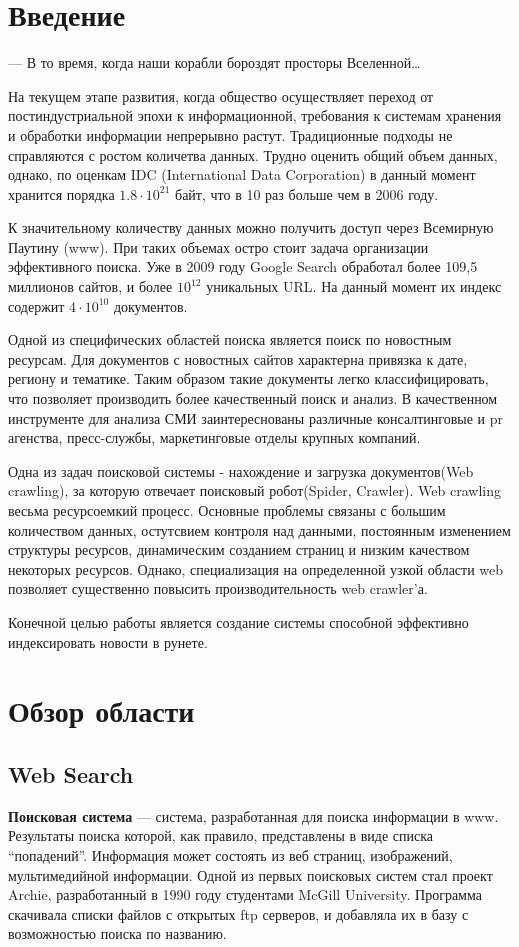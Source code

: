 \chapter{Введение} 
\epigraph{— В то время, когда наши корабли бороздят просторы
Вселенной…}{} На текущем этапе развития, когда общество осуществляет переход от
постиндустриальной эпохи к информационной, требования к системам хранения и
обработки информации непрерывно растут. Традиционные подходы не справляются с
ростом количетва данных. Трудно оценить общий объем данных, однако, по оценкам
IDC (International Data Corporation) в данный момент хранится порядка
$1.8\cdot10^{21}$ байт, что в 10 раз больше чем в 2006 году.

К значительному количеству данных можно получить доступ через Всемирную Паутину
(www). При таких объемах остро стоит задача организации эффективного поиска. Уже
в 2009 году Google Search обработал более 109,5 миллионов сайтов, и более
$10^{12}$ уникальных URL. На данный момент их индекс содержит $4\cdot10^{10}$ документов.

Одной из специфических областей поиска является поиск по новостным ресурсам.
 Для документов с новостных сайтов характерна привязка к дате, региону и тематике.
 Таким образом такие документы легко классифицировать, что позволяет производить более качественный поиск и анализ.
 В качественном инструменте для анализа СМИ заинтереснованы различные консалтинговые и pr агенства, пресс-службы, маркетинговые отделы крупных компаний.

Одна из задач поисковой системы - нахождение и загрузка документов(Web crawling), за которую отвечает поисковый робот(Spider, Crawler).
 Web crawling весьма ресурсоемкий процесс. Основные проблемы связаны с большим количеством данных,
 остутсвием  контроля над данными, постоянным изменением структуры ресурсов, динамическим созданием страниц и низким качеством некоторых ресурсов.
 Однако, специализация на определенной узкой области web позволяет существенно повысить производительность web crawler'а.

Конечной целью работы является создание системы способной эффективно индексировать новости в рунете.

\chapter{Обзор области}
\section{Web Search} 
\textbf{Поисковая система} --- система, разработанная для
поиска информации в www. Результаты поиска которой, как правило, представлены в
виде списка ``попадений''. Информация может состоять из веб страниц,  изображений,
мультимедийной информации. Одной из первых поисковых систем стал
проект Archie, разработанный в 1990 году студентами McGill University. Программа скачивала
списки файлов с открытых ftp серверов, и добавляла их в базу с возможностью
поиска по названию. %

